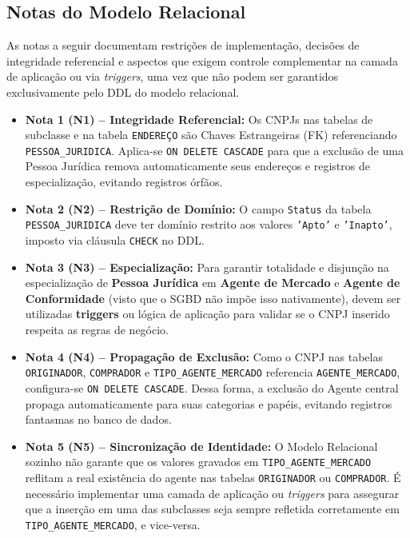 \documentclass[12pt]{article}
\begin{document}
\subsection{Notas do Modelo Relacional}
 
As notas a seguir documentam restrições de implementação, decisões de integridade referencial e aspectos que exigem controle complementar na camada de aplicação ou via \textit{triggers}, uma vez que não podem ser garantidos exclusivamente pelo DDL do modelo relacional.
 
\begin{itemize}
 
    \item \textbf{Nota 1 (N1) -- Integridade Referencial:}
    Os CNPJs nas tabelas de subclasse e na tabela \texttt{ENDEREÇO} são Chaves Estrangeiras (FK) referenciando \texttt{PESSOA\_JURIDICA}. Aplica-se \texttt{ON DELETE CASCADE} para que a exclusão de uma Pessoa Jurídica remova automaticamente seus endereços e registros de especialização, evitando registros órfãos.
 
    \item \textbf{Nota 2 (N2) -- Restrição de Domínio:}
    O campo \texttt{Status} da tabela \texttt{PESSOA\_JURIDICA} deve ter domínio restrito aos valores \texttt{'Apto'} e \texttt{'Inapto'}, imposto via cláusula \texttt{CHECK} no DDL.
 
    \item \textbf{Nota 3 (N3) -- Especialização:}
    Para garantir totalidade e disjunção na especialização de \textbf{Pessoa Jurídica} em \textbf{Agente de Mercado} e \textbf{Agente de Conformidade} (visto que o SGBD não impõe isso nativamente), devem ser utilizadas \textbf{triggers} ou lógica de aplicação para validar se o CNPJ inserido respeita as regras de negócio.
 
    \item \textbf{Nota 4 (N4) -- Propagação de Exclusão:}
    Como o CNPJ nas tabelas \texttt{ORIGINADOR}, \texttt{COMPRADOR} e \texttt{TIPO\_AGENTE\_MERCADO} referencia \texttt{AGENTE\_MERCADO}, configura-se \texttt{ON DELETE CASCADE}. Dessa forma, a exclusão do Agente central propaga automaticamente para suas categorias e papéis, evitando registros fantasmas no banco de dados.
 
    \item \textbf{Nota 5 (N5) -- Sincronização de Identidade:}
    O Modelo Relacional sozinho não garante que os valores gravados em \texttt{TIPO\_AGENTE\_MERCADO} reflitam a real existência do agente nas tabelas \texttt{ORIGINADOR} ou \texttt{COMPRADOR}. É necessário implementar uma camada de aplicação ou \textit{triggers} para assegurar que a inserção em uma das subclasses seja sempre refletida corretamente em \texttt{TIPO\_AGENTE\_MERCADO}, e vice-versa.
 

\end{itemize}
\end{document}
